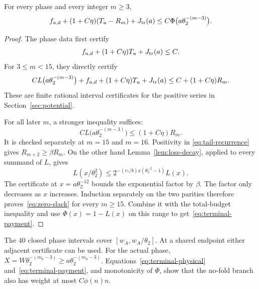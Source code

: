 \begin{lemma}\label{lem:terminal-payment}
For every phase and every integer $m\ge3$,
\begin{equation}\label{eq:terminal-payment}
 f_{a,d}+(1+C\eta)(T_u-R_m)+J_{\rm tr}(a)
                 \le C\Phi\bigl(a\theta_2^{-(m-3)}\bigr).
\end{equation}
\end{lemma}
\begin{proof}
The phase data first certify
\[
       f_{a,d}+(1+C\eta)T_u+J_{\rm tr}(a)\le C.
\]
For $3\le m<15$, they directly certify
\[
 C L\bigl(a\theta_2^{-(m-3)}\bigr)
    +f_{a,d}+(1+C\eta)T_u+J_{\rm tr}(a)
                      \le C+(1+C\eta)R_m.
\]
These are finite rational interval certificates for the positive series
in Section~\ref{sec:potential}.

For all later $m$, a stronger inequality suffices:
\begin{equation}\label{eq:zero-slack}
            C L\bigl(a\theta_2^{-(m-3)}\bigr)\le(1+C\eta)R_m.
\end{equation}
It is checked separately at $m=15$ and $m=16$. Positivity in
\eqref{eq:tail-recurrence} gives $R_{m+2}\ge\beta R_m$.
On the other hand Lemma~\ref{lem:loss-decay}, applied to every summand of
$L$, gives
\[
 L(x/\theta_2^2)\le
  2^{-(r_*/b)x(\theta_2^{-2}-1)}L(x).
\]
The certificate at $x=a\theta_2^{-12}$ bounds the exponential factor by
$\beta$. The factor only decreases as $x$ increases. Induction separately
on the two parities therefore proves~\eqref{eq:zero-slack} for every
$m\ge15$. Combine it with the total-budget inequality and use
$\Phi(x)=1-L(x)$ on this range to get~\eqref{eq:terminal-payment}.
\end{proof}

The $40$ closed phase intervals cover $[w_A,w_A/\theta_2]$. At a shared
endpoint either adjacent certificate can be used. For the actual phase,
$X=W\theta_2^{-(m_0-3)}\ge a\theta_2^{-(m_0-3)}$.
Equations~\eqref{eq:terminal-physical} and~\eqref{eq:terminal-payment},
and monotonicity of $\Phi$, show that the no-fold branch also has weight
at most $C\phi(n)n$.
